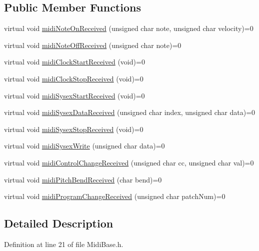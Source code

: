 \subsection*{Public Member Functions}
\begin{DoxyCompactItemize}
\item 
virtual void \hyperlink{class_midi_base_aa977f9f3db59b0a8b892ee28bcf93695}{midi\+Note\+On\+Received} (unsigned char note, unsigned char velocity)=0
\item 
virtual void \hyperlink{class_midi_base_aa26f04b4ead215bce201e480faf7c914}{midi\+Note\+Off\+Received} (unsigned char note)=0
\item 
virtual void \hyperlink{class_midi_base_aa368fed406eb62f900beb801e0552709}{midi\+Clock\+Start\+Received} (void)=0
\item 
virtual void \hyperlink{class_midi_base_ab9a5c65ebffdfc31e118fef9e4dd04bb}{midi\+Clock\+Stop\+Received} (void)=0
\item 
virtual void \hyperlink{class_midi_base_a3b3e70e61a2f2fa169bf694eeefeb0fd}{midi\+Sysex\+Start\+Received} (void)=0
\item 
virtual void \hyperlink{class_midi_base_ade00871c0c9e32bfacf34480faf0d37b}{midi\+Sysex\+Data\+Received} (unsigned char index, unsigned char data)=0
\item 
virtual void \hyperlink{class_midi_base_a14d11f47e731a26535f855a99893d092}{midi\+Sysex\+Stop\+Received} (void)=0
\item 
virtual void \hyperlink{class_midi_base_a747dece3a9e16a13766073d9e675887b}{midi\+Sysex\+Write} (unsigned char data)=0
\item 
virtual void \hyperlink{class_midi_base_a8364d72d525fd8a766a124ca3230a4c7}{midi\+Control\+Change\+Received} (unsigned char cc, unsigned char val)=0
\item 
virtual void \hyperlink{class_midi_base_acfb1d2aef9901779bb53e0847121c13d}{midi\+Pitch\+Bend\+Received} (char bend)=0
\item 
virtual void \hyperlink{class_midi_base_a968da0cf67e9a84757cbc2dbce90bc39}{midi\+Program\+Change\+Received} (unsigned char patch\+Num)=0
\end{DoxyCompactItemize}


\subsection{Detailed Description}


Definition at line 21 of file Midi\+Base.\+h.



